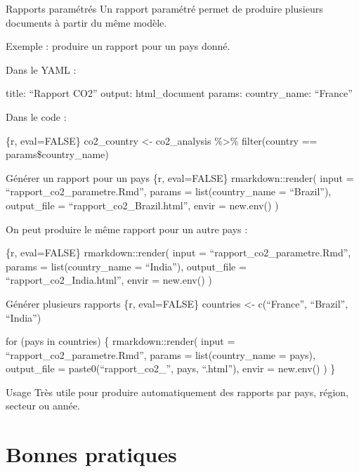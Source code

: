 \documentclass[
  10pt,
  ignorenonframetext,
]{beamer}
\begin{document}
\begin{frame}{Rapports paramétrés}
\label{rapports-paramuxe9truxe9s}
Un rapport paramétré permet de produire plusieurs documents à partir du
même modèle.

Exemple : produire un rapport pour un pays donné.

Dans le YAML :

title: ``Rapport CO2'' output: html\_document params: country\_name:
``France''

Dans le code :

\{r, eval=FALSE\} co2\_country \textless- co2\_analysis \%\textgreater\%
filter(country == params\$country\_name)
\end{frame}

\begin{frame}{Générer un rapport pour un pays}
\label{guxe9nuxe9rer-un-rapport-pour-un-pays}
\{r, eval=FALSE\} rmarkdown::render( input =
``rapport\_co2\_parametre.Rmd'', params = list(country\_name =
``Brazil''), output\_file = ``rapport\_co2\_Brazil.html'', envir =
new.env() )

On peut produire le même rapport pour un autre pays :

\{r, eval=FALSE\} rmarkdown::render( input =
``rapport\_co2\_parametre.Rmd'', params = list(country\_name =
``India''), output\_file = ``rapport\_co2\_India.html'', envir =
new.env() )
\end{frame}

\begin{frame}{Générer plusieurs rapports}
\label{guxe9nuxe9rer-plusieurs-rapports}
\{r, eval=FALSE\} countries \textless- c(``France'', ``Brazil'',
``India'')

for (pays in countries) \{ rmarkdown::render( input =
``rapport\_co2\_parametre.Rmd'', params = list(country\_name = pays),
output\_file = paste0(``rapport\_co2\_'', pays, ``.html''), envir =
new.env() ) \}

\begin{block}{Usage}
Très utile pour produire automatiquement des rapports par pays, région, secteur ou année.
\end{block}
\end{frame}

\section{Bonnes pratiques}\label{bonnes-pratiques}
\end{document}
